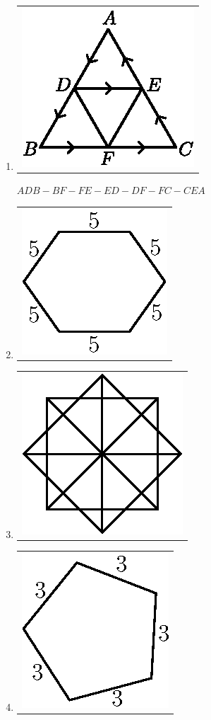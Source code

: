 \begin{enumerate}
\item 
\begin{tabular}[c]{c}
\centering
\includegraphics{src/figures/ans34.eps}
\end{tabular}
$ADB - BF - FE-ED-DF-FC-CEA$

\item 
\begin{tabular}[c]{c}
\centering
\includegraphics{src/figures/ans35.eps}
\end{tabular}

\item 
\begin{tabular}[c]{c}
\centering
\includegraphics{src/figures/ans36.eps}
\end{tabular}

\item 
\begin{tabular}[c]{c}
\centering
\includegraphics{src/figures/ans37.eps}
\end{tabular}


\end{enumerate}

